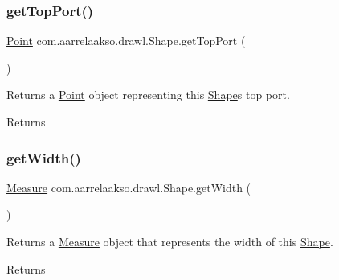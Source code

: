 \subsubsection{\texorpdfstring{get\+Top\+Port()}{getTopPort()}}
{\footnotesize\ttfamily \hyperlink{classcom_1_1aarrelaakso_1_1drawl_1_1_point}{Point} com.\+aarrelaakso.\+drawl.\+Shape.\+get\+Top\+Port (\begin{DoxyParamCaption}{ }\end{DoxyParamCaption})\hspace{0.3cm}{\ttfamily [inherited]}}



Returns a \hyperlink{classcom_1_1aarrelaakso_1_1drawl_1_1_point}{Point} object representing this \hyperlink{classcom_1_1aarrelaakso_1_1drawl_1_1_shape}{Shape}\textquotesingle{}s top port. 

\begin{DoxyReturn}{Returns}

\end{DoxyReturn}
\mbox{\label{classcom_1_1aarrelaakso_1_1drawl_1_1_shape_a3e2c58984f1bcbc2e9e86cf30868561e}} 
\subsubsection{\texorpdfstring{get\+Width()}{getWidth()}}
{\footnotesize\ttfamily \hyperlink{classcom_1_1aarrelaakso_1_1drawl_1_1_measure}{Measure} com.\+aarrelaakso.\+drawl.\+Shape.\+get\+Width (\begin{DoxyParamCaption}{ }\end{DoxyParamCaption})\hspace{0.3cm}{\ttfamily [inherited]}}



Returns a \hyperlink{classcom_1_1aarrelaakso_1_1drawl_1_1_measure}{Measure} object that represents the width of this \hyperlink{classcom_1_1aarrelaakso_1_1drawl_1_1_shape}{Shape}. 

\begin{DoxyReturn}{Returns}

\end{DoxyReturn}
\mbox{\label{classcom_1_1aarrelaakso_1_1drawl_1_1_shape_a037a5515b2a6e1df1d1981aa5516e78e}} 
